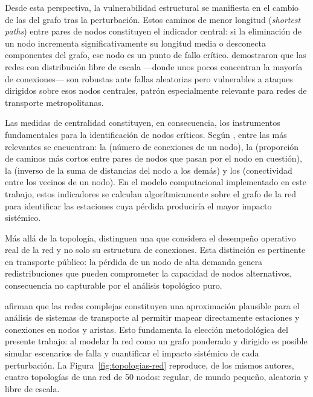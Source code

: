 Desde esta perspectiva, la vulnerabilidad estructural se manifiesta en el cambio
de las  del grafo tras la perturbación. Estos caminos de
menor longitud (\textit{shortest paths}) entre pares de nodos constituyen el
indicador central: si la eliminación de un nodo incrementa significativamente su
longitud media o desconecta componentes del grafo, ese nodo es un punto de fallo
crítico. \citet{albert2000error} demostraron que las redes con distribución
libre de escala ---donde unos pocos  concentran la mayoría de
conexiones--- son robustas ante fallas aleatorias pero vulnerables a ataques
dirigidos sobre esos nodos centrales, patrón especialmente relevante para redes
de transporte metropolitanas.

Las medidas de centralidad constituyen, en consecuencia, los instrumentos
fundamentales para la identificación de nodos críticos. Según
\citet{lotero2014vulnerabilidad}, entre las más relevantes se encuentran: la
 (número de conexiones de un nodo), la
 (proporción de caminos más cortos entre
pares de nodos que pasan por el nodo en cuestión), la
 (inverso de la suma de distancias del nodo a
los demás) y los  (conectividad entre los
vecinos de un nodo). En el modelo computacional implementado en este trabajo,
estos indicadores se calculan algorítmicamente sobre el grafo de la red para
identificar las estaciones cuya pérdida produciría el mayor impacto sistémico.

Más allá de la topología, \citet{ouyang2009vulnerability} distinguen una
 que considera el desempeño operativo real de
la red y no solo su estructura de conexiones. Esta distinción es pertinente en
transporte público: la pérdida de un nodo de alta demanda genera
redistribuciones que pueden comprometer la capacidad de nodos alternativos,
consecuencia no capturable por el análisis topológico puro.

\citet{lotero2014vulnerabilidad} afirman que las redes complejas constituyen una
aproximación plausible para el análisis de sistemas de transporte al permitir
mapear directamente estaciones y conexiones en nodos y aristas. Esto fundamenta
la elección metodológica del presente trabajo: al modelar la red como un grafo
ponderado y dirigido es posible simular escenarios de falla y cuantificar el
impacto sistémico de cada perturbación. La Figura~\ref{fig:topologias-red}
reproduce, de los mismos autores, cuatro topologías de una red de 50 nodos:
regular, de mundo pequeño, aleatoria y libre de escala.

